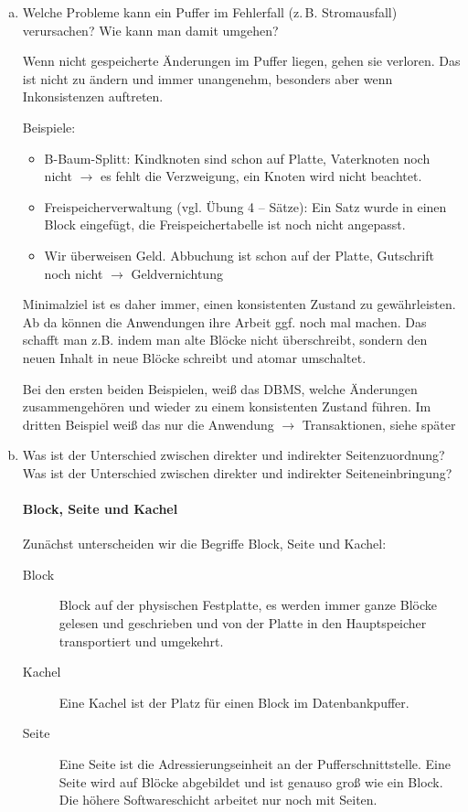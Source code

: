 \begin{enumerate}[a)]
	\item Welche Probleme kann ein Puffer im Fehlerfall (z.\,B. Stromausfall) verursachen? Wie kann man damit umgehen?

	\begin{solution}
	Wenn nicht gespeicherte Änderungen im Puffer liegen, gehen sie verloren. Das ist nicht zu ändern und immer unangenehm, besonders aber wenn Inkonsistenzen auftreten.

	Beispiele:
	\begin{itemize}
		\item B-Baum-Splitt: Kindknoten sind schon auf Platte, Vaterknoten noch nicht $\rightarrow$ es fehlt die Verzweigung, ein Knoten wird nicht beachtet.
		\item Freispeicherverwaltung (vgl. Übung 4 -- Sätze): Ein Satz wurde in einen Block eingefügt, die Freispeichertabelle ist noch nicht angepasst.
		\item Wir überweisen Geld. Abbuchung ist schon auf der Platte, Gutschrift noch nicht $\rightarrow$ Geldvernichtung
	\end{itemize}
	Minimalziel ist es daher immer, einen konsistenten Zustand zu gewährleisten. Ab da können die Anwendungen ihre Arbeit ggf. noch mal machen. Das schafft man z.B. indem man alte Blöcke nicht überschreibt, sondern den neuen Inhalt in neue Blöcke schreibt und atomar umschaltet.

	Bei den ersten beiden Beispielen, weiß das DBMS, welche Änderungen zusammengehören und wieder zu einem konsistenten Zustand führen. Im dritten Beispiel weiß das nur die Anwendung $\rightarrow$ Transaktionen, siehe später
	\end{solution}


	\item Was ist der Unterschied zwischen direkter und indirekter Seitenzuordnung? Was ist der Unterschied zwischen direkter und indirekter Seiteneinbringung?

	\begin{solution}

	\paragraph{Block, Seite und Kachel}
	Zunächst unterscheiden wir die Begriffe Block, Seite und Kachel:
	\begin{description}
		\item[Block] Block auf der physischen Festplatte, es werden immer ganze Blöcke gelesen und geschrieben und von der Platte in den Hauptspeicher transportiert und umgekehrt.
		\item[Kachel] Eine Kachel ist der Platz für einen Block im Datenbankpuffer. %
		\item[Seite] Eine Seite ist die Adressierungseinheit an der Pufferschnittstelle. Eine Seite wird auf Blöcke abgebildet und ist genauso groß wie ein Block. Die höhere Softwareschicht arbeitet nur noch mit Seiten.
	\end{description}



\end{solution}
\end{enumerate}
